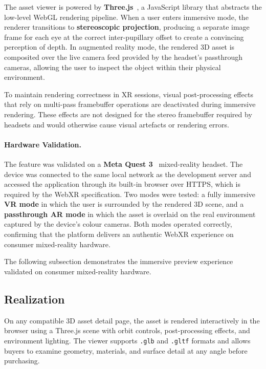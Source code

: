 The asset viewer is powered by \textbf{Three.js}~\cite{threejs}, a JavaScript library
that abstracts the low-level WebGL rendering pipeline. When a user enters immersive
mode, the renderer transitions to \textbf{stereoscopic projection}, producing a
separate image frame for each eye at the correct inter-pupillary offset to create a
convincing perception of depth. In augmented reality mode, the rendered 3D asset is
composited over the live camera feed provided by the headset's passthrough cameras,
allowing the user to inspect the object within their physical environment.

To maintain rendering correctness in XR sessions, visual post-processing effects
that rely on multi-pass framebuffer operations are deactivated during immersive
rendering. These effects are not designed for the stereo framebuffer required by
headsets and would otherwise cause visual artefacts or rendering errors.

\paragraph{Hardware Validation.}
The feature was validated on a \textbf{Meta Quest 3}~\cite{metaquest} mixed-reality
headset. The device was connected to the same local network as the development server
and accessed the application through its built-in browser over HTTPS, which is
required by the WebXR specification. Two modes were tested: a fully immersive
\textbf{VR mode} in which the user is surrounded by the rendered 3D scene, and a
\textbf{passthrough AR mode} in which the asset is overlaid on the real environment
captured by the device's colour cameras. Both modes operated correctly, confirming
that the platform delivers an authentic WebXR experience on consumer mixed-reality
hardware.

The following subsection demonstrates the immersive preview experience validated on consumer mixed-reality hardware.

\subsection{Realization}

On any compatible 3D asset detail page, the asset is rendered interactively in the
browser using a Three.js scene with orbit controls, post-processing effects, and
environment lighting. The viewer supports \texttt{.glb} and \texttt{.gltf} formats
and allows buyers to examine geometry, materials, and surface detail at any angle
before purchasing.


